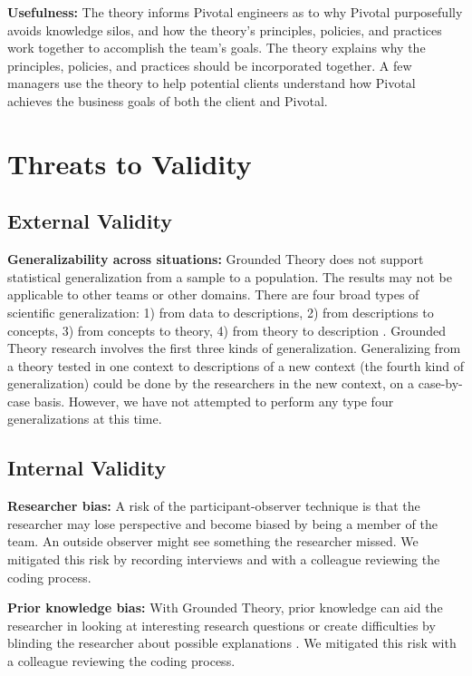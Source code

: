 \textbf{Usefulness:} The theory informs Pivotal engineers as to why Pivotal purposefully avoids knowledge silos, and how the theory's principles, policies, and practices work together to accomplish the team's goals. The theory explains why the principles, policies, and practices should be incorporated together. A few managers use  the theory to help potential clients understand how Pivotal achieves the business goals of both the client and Pivotal.

\section{Threats to Validity}

\subsection{External Validity}

\textbf{Generalizability across situations:} Grounded Theory does not support statistical generalization from a sample to a population. The results may not be applicable to other teams or other domains. There are four broad types of scientific generalization: 1) from data to descriptions, 2) from descriptions to concepts, 3) from concepts to theory, 4) from theory to description \cite{Lee2003generalizing}. Grounded Theory research involves the first three kinds of generalization. Generalizing from a theory tested in one context to descriptions of a new context (the fourth kind of generalization) could be done by the researchers in the new context, on a case-by-case basis. However, we have not attempted to perform any type four generalizations at this time.

\subsection{Internal Validity}
\textbf{Researcher bias:} A risk of the participant-observer technique is that the researcher may lose perspective and become biased by being a member of the team. An outside observer might see something the researcher missed. We mitigated this risk by recording interviews and with a colleague reviewing the coding process.

\textbf{Prior knowledge bias:} With Grounded Theory, prior knowledge can aid the researcher in looking at interesting research questions or create difficulties by blinding the researcher about possible explanations \cite{GlaserIssues}. We mitigated this risk with a colleague reviewing the coding process. 
